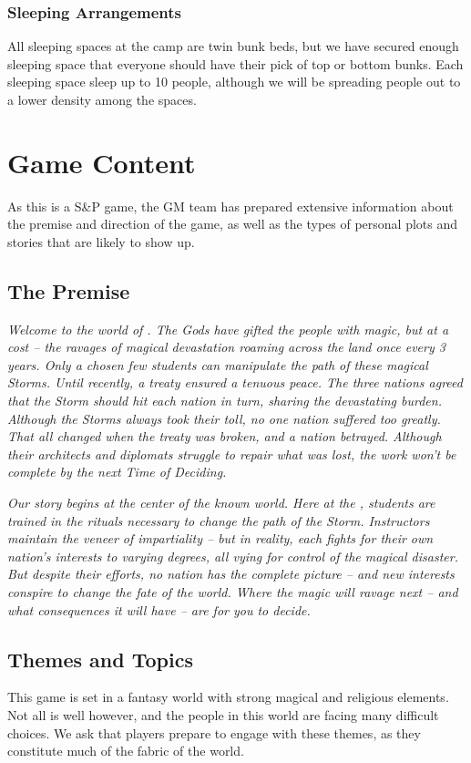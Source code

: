 \documentclass[sheet]{GL2020}
\begin{document}
\subsubsection{Sleeping Arrangements}
All sleeping spaces at the camp are twin bunk beds, but we have secured enough sleeping space that everyone should have their pick of top or bottom bunks. Each sleeping space sleep up to 10 people, although we will be spreading people out to a lower density among the spaces.

\section{Game Content}
As this is a S\&P game, the GM team has prepared extensive information about the premise and direction of the game, as well as the types of personal plots and stories that are likely to show up.

\subsection{The Premise}
\emph{Welcome to the world of \pEarth{}. The Gods have gifted the people with magic, but at a cost -- the ravages of magical devastation roaming across the land once every 3 years. Only a chosen few students can manipulate the path of these magical Storms. Until recently, a treaty ensured a tenuous peace. The three nations agreed that the Storm should hit each nation in turn, sharing the devastating burden. Although the Storms always took their toll, no one nation suffered too greatly. That all changed when the treaty was broken, and a nation betrayed. Although their architects and diplomats struggle to repair what was lost, the work won't be complete by the next Time of Deciding.}

\emph{Our story begins at the center of the known world. Here at the \pSchool{}, students are trained in the rituals necessary to change the path of the Storm. Instructors maintain the veneer of impartiality -- but in reality, each fights for their own nation's interests to varying degrees, all vying for control of the magical disaster. But despite their efforts, no nation has the complete picture -- and new interests conspire to change the fate of the world. Where the magic will ravage next -- and what consequences it will have -- are for you to decide.}

\subsection{Themes and Topics}
This game is set in a fantasy world with strong magical and religious elements. Not all is well however, and the people in this world are facing many difficult choices. We ask that players prepare to engage with these themes, as they constitute much of the fabric of the world.
\end{document}

